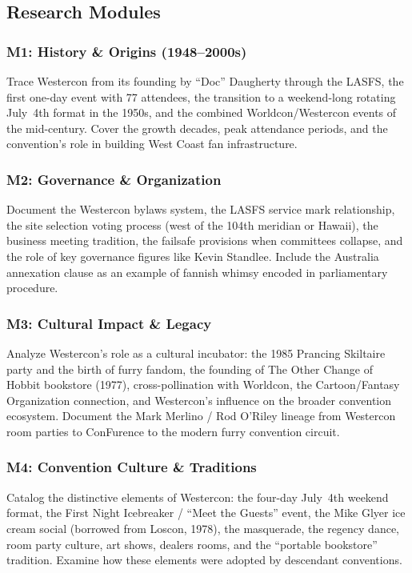 \documentclass[11pt,letterpaper]{article}
\begin{document}
\subsection{Research Modules}

\subsubsection{M1: History \& Origins (1948--2000s)}

Trace Westercon from its founding by ``Doc'' Daugherty through the LASFS, the first one-day event with 77 attendees, the transition to a weekend-long rotating July~4th format in the 1950s, and the combined Worldcon/Westercon events of the mid-century. Cover the growth decades, peak attendance periods, and the convention's role in building West Coast fan infrastructure.

\subsubsection{M2: Governance \& Organization}

Document the Westercon bylaws system, the LASFS service mark relationship, the site selection voting process (west of the 104th meridian or Hawaii), the business meeting tradition, the failsafe provisions when committees collapse, and the role of key governance figures like Kevin Standlee. Include the Australia annexation clause as an example of fannish whimsy encoded in parliamentary procedure.

\subsubsection{M3: Cultural Impact \& Legacy}

Analyze Westercon's role as a cultural incubator: the 1985 Prancing Skiltaire party and the birth of furry fandom, the founding of The Other Change of Hobbit bookstore (1977), cross-pollination with Worldcon, the Cartoon/Fantasy Organization connection, and Westercon's influence on the broader convention ecosystem. Document the Mark Merlino / Rod O'Riley lineage from Westercon room parties to ConFurence to the modern furry convention circuit.

\subsubsection{M4: Convention Culture \& Traditions}

Catalog the distinctive elements of Westercon: the four-day July~4th weekend format, the First Night Icebreaker / ``Meet the Guests'' event, the Mike Glyer ice cream social (borrowed from Loscon, 1978), the masquerade, the regency dance, room party culture, art shows, dealers rooms, and the ``portable bookstore'' tradition. Examine how these elements were adopted by descendant conventions.
\end{document}
